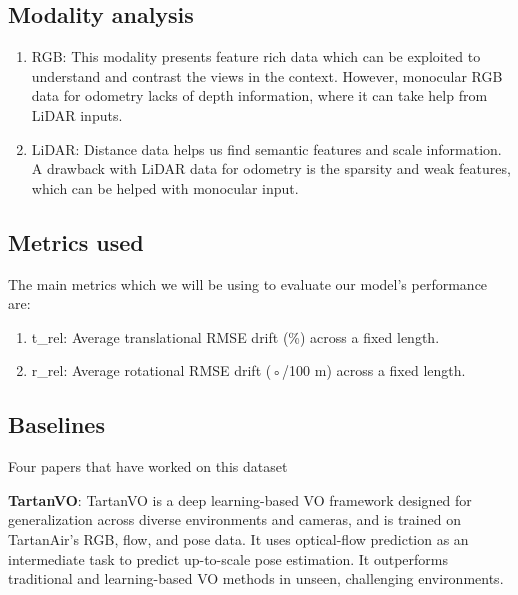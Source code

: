 \documentclass[11pt,a4paper]{article}
\begin{document}


\subsection{Modality analysis}
  \begin{enumerate}
    \item RGB: This modality presents feature rich data which can be exploited to understand and contrast the views in the context. However, monocular RGB data for odometry lacks of depth information, where it can take help from LiDAR inputs. 
    \item LiDAR: Distance data helps us find semantic features and scale information. A drawback with LiDAR data for odometry is the sparsity and weak features, which can be helped with monocular input.
    
  \end{enumerate}
  

\subsection{Metrics used}
The main metrics which we will be using to evaluate our model's performance are:

\begin{enumerate}
    \item t\_rel: Average translational RMSE drift (\%) across a fixed length.
    
    \item r\_rel: Average rotational RMSE drift (◦/100 m) across a fixed length.
\end{enumerate}

\subsection{Baselines} 
Four papers that have worked on this dataset

\textbf{TartanVO}: TartanVO is a deep learning-based VO framework designed for generalization across diverse environments and cameras, and is trained on TartanAir's RGB, flow, and pose data. It uses optical-flow prediction as an intermediate task to predict up-to-scale pose estimation. It outperforms traditional and learning-based VO methods in unseen, challenging environments.\cite{tartanvo2020corl} \\
\end{document}
